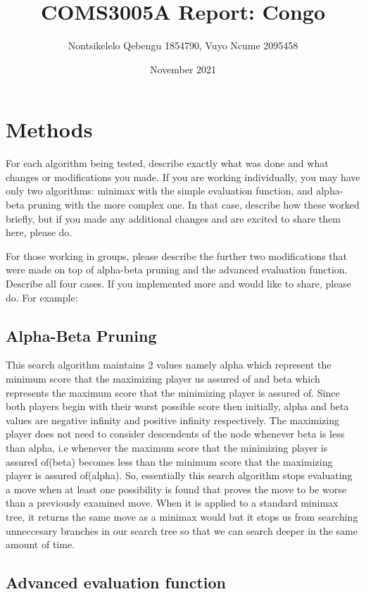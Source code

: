 \documentclass[twocolumn]{article}
\title{COMS3005A Report: Congo}
\author{Nontsikelelo Qebengu 1854790, Vuyo Ncume 2095458}
\date{November 2021}
\begin{document}
\maketitle

\section{Methods}

For each algorithm being tested, describe exactly what was done and what changes or modifications you made. If you are working individually, you may have only two algorithms: minimax with the simple evaluation function, and alpha-beta pruning with the more complex one. In that case, describe how these worked briefly, but if you made any additional changes and are excited to share them here, please do.

For those working in groups, please describe the further two modifications that were made on top of alpha-beta pruning and the advanced evaluation function. Describe all four cases. If you implemented more and would like to share, please do.
For example:

\subsection{Alpha-Beta Pruning}

This search algorithm maintains 2 values namely alpha which represent the minimum score that the maximizing player us assured of and beta which represents the maximum score that the minimizing player is assured of. Since both players begin with their worst possible score then initially, alpha and beta values are negative infinity and positive infinity respectively. The maximizing player does not need to consider descendents of the node whenever beta is less than alpha, i.e whenever the maximum score that the minimizing player is assured of(beta) becomes less than the minimum score that the maximizing player is assured of(alpha). So, essentially this search algorithm stops evaluating a move when at least one possibility is found that proves the move to be worse than a previously examined move. When it is applied to a standard minimax tree, it returns the same move as a minimax would but it stops us from searching unneccesary branches in our search tree so that we can search deeper in the same amount of time.

\subsection{Advanced evaluation function}
\end{document}
